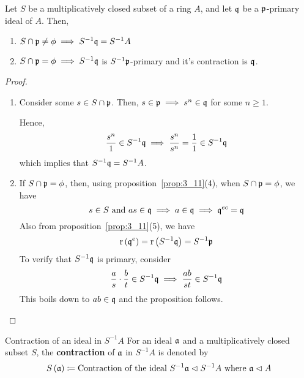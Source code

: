 \begin{proposition}{}{}
\label{prop:4_8}
	Let \(S\) be a multiplicatively closed subset of a ring \(A\),
	and let \(\mathfrak{q}\) be a \(\mathfrak{p}\)-primary ideal of \(A\).
	Then,
	\begin{enumerate}
		\item \(S \cap \mathfrak{p} \neq \phi \implies S^{-1}\mathfrak{q} = S^{-1} A\)
		\item \(S \cap \mathfrak{p} = \phi \implies S^{-1}\mathfrak{q}\) is
			\(S^{-1}\mathfrak{p}\)-primary and it's contraction is \(\mathfrak{q}\).
	\end{enumerate}
\end{proposition}
\begin{proof} \
	\begin{enumerate}
		\item Consider some \(s \in S \cap \mathfrak{p}\).
		Then, \(s \in \mathfrak{p} \implies s^n \in \mathfrak{q}\) for some
		\(n \geq 1\).

		Hence,
		\[
			\frac{s^n}{1} \in S^{-1}\mathfrak{q} \implies
			\frac{s^n}{s^n} = \frac{1}{1} \in S^{-1}\mathfrak{q}
		\]
		which implies that \(S^{-1}\mathfrak{q} = S^{-1}A\).

		\item If \(S \cap \mathfrak{p} = \phi\), then, using
		proposition~\ref{prop:3_11}(4), when \(S \cap \mathfrak{p} = \phi\), we have
		\[
			s \in S \text{ and } as \in \mathfrak{q} \implies a \in \mathfrak{q}
			\implies \mathfrak{q}^{ec} = \mathfrak{q}
		\]
		Also from proposition~\ref{prop:3_11}(5), we have
		\[
			\operatorname{r}\left( \mathfrak{q}^e \right) = \operatorname{r}\left( S^{-1}\mathfrak{q} \right) = S^{-1}\mathfrak{p}
		\]
		To verify that \(S^{-1}\mathfrak{q}\) is primary, consider
		\[
			\frac{a}{s} \cdot \frac{b}{t} \in S^{-1}\mathfrak{q}
			\implies \frac{ab}{st} \in S^{-1}\mathfrak{q}
		\]
		This boils down to \(ab \in \mathfrak{q}\) and the proposition follows.
	\end{enumerate}
\end{proof}

\begin{defn}{Contraction of an ideal in \(S^{-1}A\)}{}
	For an ideal \(\mathfrak{a}\) and a multiplicatively closed subset \(S\),
	the \textbf{contraction} of \(\mathfrak{a}\) in \(S^{-1}A\) is denoted by
	\[
		S\left( \mathfrak{a} \right) \coloneqq \text{Contraction of the ideal }
		S^{-1}\mathfrak{a} \vartriangleleft S^{-1}A \text{ where } \mathfrak{a} \vartriangleleft A
	\]
\end{defn}


